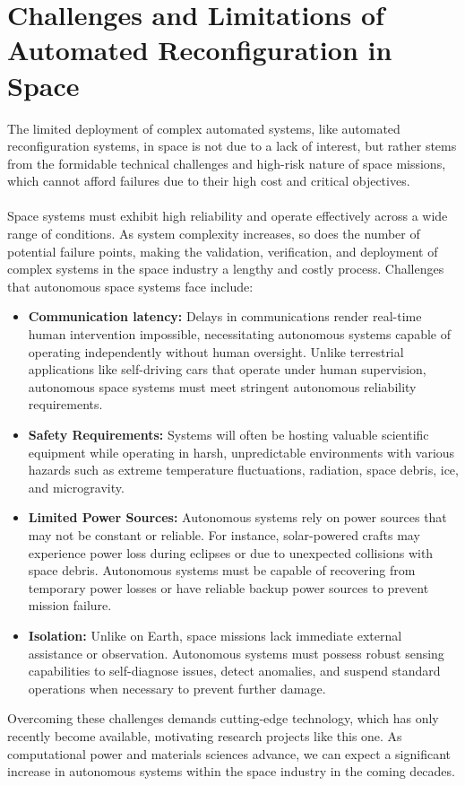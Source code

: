 \newpage
\section{Challenges and Limitations of Automated Reconfiguration in Space}
The limited deployment of complex automated systems, like automated reconfiguration systems, in space is not due to a lack of interest, but rather stems from the formidable technical challenges and high-risk nature of space missions, which cannot afford failures due to their high cost and critical objectives.
\\\\
Space systems must exhibit high reliability and operate effectively across a wide range of conditions. As system complexity increases, so does the number of potential failure points, making the validation, verification, and deployment of complex systems in the space industry a lengthy and costly process. Challenges that autonomous space systems face include:
\\
\begin{itemize}[]
	\item \textbf{Communication latency:} Delays in communications render real-time human intervention impossible, necessitating autonomous systems capable of operating independently without human oversight. Unlike terrestrial applications like self-driving cars that operate under human supervision, autonomous space systems must meet stringent autonomous reliability requirements.
	\\
	\item \textbf{Safety Requirements:} Systems will often be hosting valuable scientific equipment while operating in harsh, unpredictable environments with various hazards such as extreme temperature fluctuations, radiation, space debris, ice, and microgravity.
	\\
	\item \textbf{Limited Power Sources:} Autonomous systems rely on power sources that may not be constant or reliable. For instance, solar-powered crafts may experience power loss during eclipses or due to unexpected collisions with space debris. Autonomous systems must be capable of recovering from temporary power losses or have reliable backup power sources to prevent mission failure.
	\\
	\item \textbf{Isolation:} Unlike on Earth, space missions lack immediate external assistance or observation. Autonomous systems must possess robust sensing capabilities to self-diagnose issues, detect anomalies, and suspend standard operations when necessary to prevent further damage.
	\\
\end{itemize}
Overcoming these challenges demands cutting-edge technology, which has only recently become available, motivating research projects like this one. As computational power and materials sciences advance, we can expect a significant increase in autonomous systems within the space industry in the coming decades.